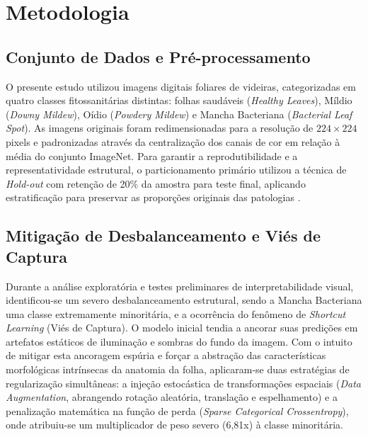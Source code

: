 \documentclass[12pt, a4paper]{article}
\begin{document}
\section{Metodologia}

\subsection{Conjunto de Dados e Pré-processamento}
O presente estudo utilizou imagens digitais foliares de videiras, categorizadas em quatro classes fitossanitárias distintas: folhas saudáveis (\textit{Healthy Leaves}), Míldio (\textit{Downy Mildew}), Oídio (\textit{Powdery Mildew}) e Mancha Bacteriana (\textit{Bacterial Leaf Spot}). As imagens originais foram redimensionadas para a resolução de $224 \times 224$ pixels e padronizadas através da centralização dos canais de cor em relação à média do conjunto ImageNet. Para garantir a reprodutibilidade e a representatividade estrutural, o particionamento primário utilizou a técnica de \textit{Hold-out} com retenção de 20\% da amostra para teste final, aplicando estratificação para preservar as proporções originais das patologias \citep{hastie2009elements}.

\subsection{Mitigação de Desbalanceamento e Viés de Captura}
Durante a análise exploratória e testes preliminares de interpretabilidade visual, identificou-se um severo desbalanceamento estrutural, sendo a Mancha Bacteriana uma classe extremamente minoritária, e a ocorrência do fenômeno de \textit{Shortcut Learning} (Viés de Captura). O modelo inicial tendia a ancorar suas predições em artefatos estáticos de iluminação e sombras do fundo da imagem. Com o intuito de mitigar esta ancoragem espúria e forçar a abstração das características morfológicas intrínsecas da anatomia da folha, aplicaram-se duas estratégias de regularização simultâneas: a injeção estocástica de transformações espaciais (\textit{Data Augmentation}, abrangendo rotação aleatória, translação e espelhamento) e a penalização matemática na função de perda (\textit{Sparse Categorical Crossentropy}), onde atribuiu-se um multiplicador de peso severo (6,81x) à classe minoritária.
\end{document}
